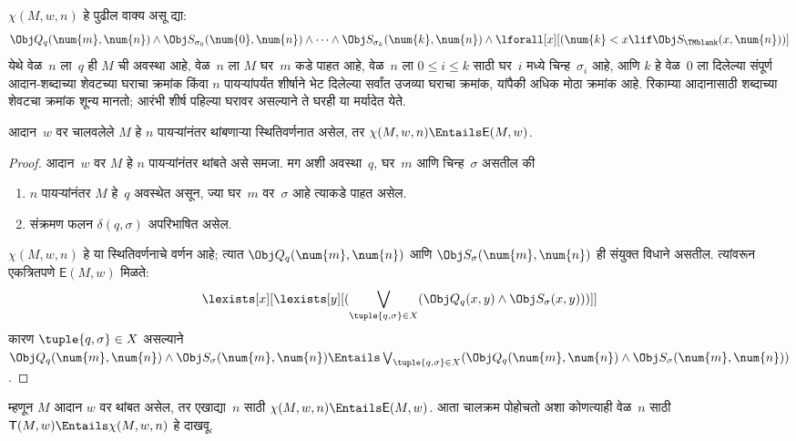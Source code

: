 \begin{defn}
$\chi(M, w, n)$ हे पुढील
वाक्य असू द्या:
\[\Obj Q_q(\num{m}, \num{n}) \land \Obj S_{\sigma_0}(\num{0}, \num{n})
\land \dots \land \Obj S_{\sigma_k}(\num{k}, \num{n}) \land
\lforall[x][(\num{k} < x \lif \Obj S_\TMblank(x, \num{n}))]
\]
येथे वेळ~$n$ ला~$q$
ही $M$ ची अवस्था आहे,
वेळ~$n$ ला $M$ घर~$m$
कडे पाहत आहे, वेळ~$n$
ला $0 \le i \le k$
साठी घर~$i$ मध्ये
चिन्ह~$\sigma_i$ आहे,
आणि $k$ हे वेळ~$0$
ला दिलेल्या संपूर्ण आदान-शब्दाच्या शेवटच्या
घराचा क्रमांक किंवा $n$ पायऱ्यांपर्यंत
शीर्षाने भेट दिलेल्या सर्वांत उजव्या
घराचा क्रमांक, यांपैकी अधिक मोठा क्रमांक आहे.
रिकाम्या आदानासाठी शब्दाच्या शेवटचा क्रमांक
शून्य मानतो; आरंभी शीर्ष पहिल्या घरावर असल्याने
ते घरही या मर्यादेत येते.

\end{defn}

\begin{lem}\label{tur:und:ver:lem:halt-config-implies-halt}
आदान~$w$ वर चालवलेले $M$
हे $n$ पायऱ्यांनंतर
थांबणाऱ्या स्थितिवर्णनात
असेल, तर $\chi(M, w, n) \Entails \mathsf{E}(M, w)$.
\end{lem}

\begin{proof}
आदान~$w$ वर $M$ हे $n$
पायऱ्यांनंतर थांबते असे
समजा. मग अशी अवस्था~$q$,
घर~$m$ आणि चिन्ह~$\sigma$
असतील की
\begin{enumerate}
\item $n$ पायऱ्यांनंतर $M$
  हे~$q$ अवस्थेत असून,
  ज्या घर~$m$ वर~$\sigma$
  आहे त्याकडे पाहत असेल.
\item संक्रमण फलन $\delta(q, \sigma)$
  अपरिभाषित असेल.
\end{enumerate}
$\chi(M, w, n)$ हे या
स्थितिवर्णनाचे वर्णन आहे;
त्यात $\Obj Q_{q}(\num{m}, \num{n})$
आणि $\Obj
S_{\sigma}(\num{m}, \num{n})$
ही संयुक्त विधाने असतील.
त्यांवरून एकत्रितपणे
$\mathsf{E}(M,
w)$ मिळते:
\[\lexists[x][\lexists[y][(\bigvee_{\tuple{q, \sigma} \in
      X}(\Obj Q_q(x, y) \land \Obj S_\sigma(x, y)))]]
\]
कारण $\tuple{q,\sigma} \in X$
असल्याने
$\Obj Q_{q}(\num{m}, \num{n}) \land \Obj S_{\sigma}(\num{m},
\num{n}) \Entails \bigvee_{\tuple{q, \sigma} \in X} (\Obj Q_q(\num{m},
\num{n}) \land \Obj S_{\sigma}(\num{m}, \num{n}))$.

\end{proof}

\begin{explain}
म्हणून $M$ आदान $w$
वर थांबत असेल, तर
एखाद्या~$n$ साठी
$\chi(M,
w, n) \Entails \mathsf{E}(M,w)$.
आता चालक्रम पोहोचतो अशा कोणत्याही वेळ~$n$
साठी $\mathsf{T}(M, w) \Entails \chi(M, w, n)$
हे दाखवू.
\end{explain}

